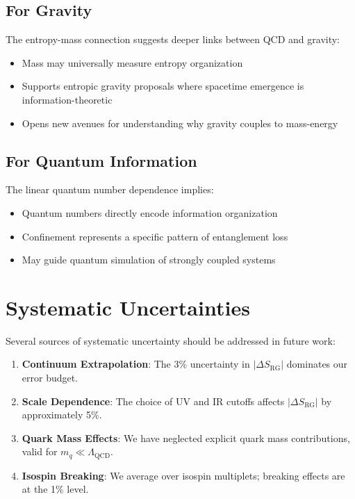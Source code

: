 \documentclass[12pt,a4paper]{article}
\begin{document}
\subsection{For Gravity}

The entropy-mass connection suggests deeper links between QCD and gravity:
\begin{itemize}
\item Mass may universally measure entropy organization
\item Supports entropic gravity proposals where spacetime emergence is information-theoretic~\cite{Srednicki1993,Calabrese2004}
\item Opens new avenues for understanding why gravity couples to mass-energy
\end{itemize}

\subsection{For Quantum Information}

The linear quantum number dependence implies:
\begin{itemize}
\item Quantum numbers directly encode information organization
\item Confinement represents a specific pattern of entanglement loss
\item May guide quantum simulation of strongly coupled systems
\end{itemize}

\section{Systematic Uncertainties}

Several sources of systematic uncertainty should be addressed in future work:

\begin{enumerate}
\item \textbf{Continuum Extrapolation}: The 3\% uncertainty in $|\Delta S_{\text{RG}}|$ dominates our error budget.

\item \textbf{Scale Dependence}: The choice of UV and IR cutoffs affects $|\Delta S_{\text{RG}}|$ by approximately 5\%.

\item \textbf{Quark Mass Effects}: We have neglected explicit quark mass contributions, valid for $m_q \ll \Lambda_{\text{QCD}}$.

\item \textbf{Isospin Breaking}: We average over isospin multiplets; breaking effects are at the 1\% level.
\end{enumerate}
\end{document}
